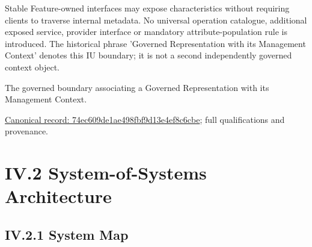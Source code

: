 Stable Feature-owned interfaces may expose characteristics without requiring clients
to traverse internal metadata. No universal operation catalogue, additional exposed
service, provider interface or mandatory attribute-population rule is introduced.
The historical phrase 'Governed Representation with its Management Context' denotes
this IU boundary; it is not a second independently governed context object.



The governed boundary associating a Governed Representation with its Management Context.


{\footnotesize \href{../../../../../../../continuum/application/data-object/class/74ec609de1ae498fbf9d13e4ef8c6cbe.md}{Canonical record: 74ec609de1ae498fbf9d13e4ef8c6cbe}; full qualifications and provenance.}\par
\chapter*{IV.2 System-of-Systems Architecture}
\label{navigation:IV.2}

\section*{IV.2.1 System Map}
\label{navigation:IV.2.1}

